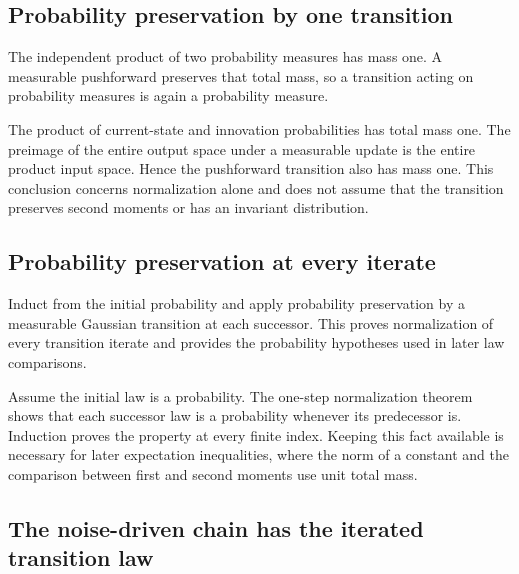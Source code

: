 \documentclass[11pt,a4paper]{report}
\begin{document}
\subsection{\texorpdfstring{Probability preservation by one transition}{Probability preservation by one transition}}
\label{report-step-UnadjustedLangevin-MarkovLaw-lean-10}


The independent product of two probability measures has mass one. A measurable pushforward preserves that total mass, so a transition acting on probability measures is again a probability measure.



The product of current-state and innovation probabilities has total mass one. The preimage of the entire output space under a measurable update is the entire product input space. Hence the pushforward transition also has mass one. This conclusion concerns normalization alone and does not assume that the transition preserves second moments or has an invariant distribution.

\subsection{\texorpdfstring{Probability preservation at every iterate}{Probability preservation at every iterate}}
\label{report-step-UnadjustedLangevin-MarkovLaw-lean-11}


Induct from the initial probability and apply probability preservation by a measurable Gaussian transition at each successor. This proves normalization of every transition iterate and provides the probability hypotheses used in later law comparisons.



Assume the initial law is a probability. The one-step normalization theorem shows that each successor law is a probability whenever its predecessor is. Induction proves the property at every finite index. Keeping this fact available is necessary for later expectation inequalities, where the norm of a constant and the comparison between first and second moments use unit total mass.

\subsection{\texorpdfstring{The noise-driven chain has the iterated transition law}{The noise-driven chain has the iterated transition law}}
\label{report-step-UnadjustedLangevin-MarkovLaw-lean-12}
\end{document}
